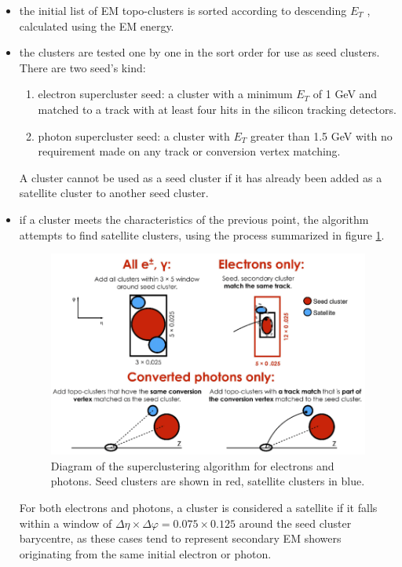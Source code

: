 \documentclass[a4paper, oneside]{book}
\begin{document}
		\begin{itemize}
		\item the initial list of EM topo-clusters is
		sorted according to descending $E_T$ , calculated using the EM energy.
		\item the clusters are tested one by one in the sort order for use as seed clusters. There are two seed's kind:
			\begin{enumerate}[label=\roman*.]
				\item electron supercluster seed: a cluster with a minimum $E_T$ of 1 GeV and matched to a track with at least four hits in the silicon tracking detectors.
				\item photon supercluster seed: a cluster with $E_T$ greater
				than 1.5 GeV with no requirement made on any track or conversion
				vertex matching.
			\end{enumerate}
		A cluster cannot be used as a seed cluster if it has already been added as a satellite cluster to another seed cluster.
		\item if a cluster meets the characteristics of the previous point, the algorithm attempts to find satellite clusters, using the process summarized in figure \ref{fig:super_cl}.
		\begin{figure}
			\centering
			\includegraphics[width=0.45\textheight]{tesi_images/super_cluster.png}
			\caption{Diagram of the superclustering algorithm for electrons and photons. Seed clusters are shown in
			red, satellite clusters in blue.}
			\label{fig:super_cl}
		\end{figure}
		For both electrons and photons, a cluster is considered a satellite if it falls within a window of $\Delta\eta \times \Delta\varphi = 0.075 \times 0.125$ around the seed cluster barycentre, as these cases tend to represent secondary EM showers originating from the same initial electron or photon.

\end{itemize}
\end{document}
